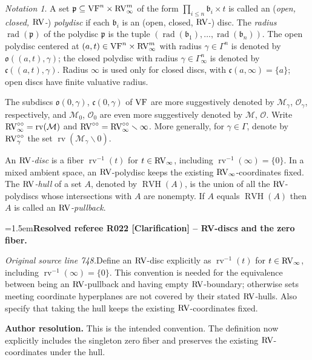 \documentclass[12pt]{amsart}
\newcommand{\ResolvedRefereeRemark}[5]{%
  \par\medskip\begingroup\normalfont\small\color{gray}%
  \emergencystretch=1.5em\noindent\textbf{Resolved referee R#1 [#2] -- #3.}\par\nobreak\noindent #4\par
  \medskip\color{ResolutionGreen}\noindent\textbf{Author resolution.} #5\par
  \endgroup\medskip
}
\newcommand{\memph}[1]{{\color{magenta}\emph{#1}}}
\theoremstyle{plain}
\theoremstyle{definition}
\theoremstyle{remark}
\newtheorem{nota}[thm]{Notation}
\numberwithin{equation}{section}
\theoremstyle{plain}
\newcommand{\VF}{\textup{VF}}
\newcommand{\RV}{\textup{RV}}
\newcommand{\MM}{\mdl M}
\newcommand{\OO}{\mdl O}
\newcommand{\gb}{\mathfrak{b}}
\newcommand{\gc}{\mathfrak{c}}
\newcommand{\go}{\mathfrak{o}}
\newcommand{\gp}{\mathfrak{p}}
\newcommand{\0}{\emptyset}
\newcommand{\mdl}[1]{\mathcal{#1}}  %
\newcommand{\sub}{\subseteq}
\newcommand{\mi}{\smallsetminus}
\DeclareMathOperator{\rv}{rv}
\DeclareMathOperator{\rad}{rad}
\DeclareMathOperator{\RVH}{RVH}
\newcommand{\ccirc}{\circ \circ}
\begin{document}
\begin{nota}\label{defn:disc}
A set $\gp \sub \VF^n \times \RV_\infty^m$ of the form $\prod_{i \leq n} \gb_i \times t$ is called an (\memph{open, closed, $\RV$-}) \memph{polydisc} if each $\gb_i$ is an (open, closed, $\RV$-) disc. The \memph{radius} $\rad(\gp)$ of the polydisc $\gp$ is the tuple $(\rad(\gb_1), \ldots, \rad(\gb_n))$. The open polydisc centered at $(a,t) \in \VF^n \times \RV_\infty^m$ with radius $\gamma \in \Gamma^n$ is denoted by $\go((a,t), \gamma)$; the closed polydisc with radius $\gamma \in \Gamma_\infty^n$ is denoted by $\gc((a,t), \gamma)$. Radius $\infty$ is used only for closed discs, with $\gc(a,\infty)=\{a\}$; open discs have finite valuative radius.

The subdiscs $\go(0, \gamma)$, $\gc(0, \gamma)$ of $\VF$ are more suggestively denoted by $\MM_\gamma$, $\OO_\gamma$, respectively, and $\MM_0$, $\OO_0$ are even more suggestively denoted by $\MM$, $\OO$. Write $\RV^{\ccirc}_\infty = \rv(\MM)$ and $\RV^{\ccirc} = \RV^{\ccirc}_\infty \mi \infty$. More generally, for $\gamma \in \Gamma$, denote by $\RV^{\ccirc}_\gamma$ the set $\rv(\MM_{\gamma} \mi 0)$.

An \memph{$\RV$-disc} is a fiber $\rv^{-1}(t)$ for $t\in\RV_\infty$, including $\rv^{-1}(\infty)=\{0\}$. In a mixed ambient space, an $\RV$-polydisc keeps the existing $\RV_\infty$-coordinates fixed. The \memph{$\RV$-hull} of a set $A$, denoted by $\RVH(A)$, is the union of all the $\RV$-polydiscs whose intersections with $A$ are nonempty. If $A$ equals $\RVH(A)$ then $A$ is called an \memph{$\RV$-pullback}.
\end{nota}

\ResolvedRefereeRemark{022}{Clarification}{RV-discs and the zero fiber}{%
\textit{Original source line 748.}\quad Define an $\RV$-disc explicitly as $\rv^{-1}(t)$ for $t\in\RV_\infty$, including $\rv^{-1}(\infty)=\{0\}$. This convention is needed for the equivalence between being an $\RV$-pullback and having empty $\RV$-boundary; otherwise sets meeting coordinate hyperplanes are not covered by their stated $\RV$-hulls. Also specify that taking the hull keeps the existing $\RV$-coordinates fixed.
}{This is the intended convention. The definition now explicitly includes the singleton zero fiber and preserves the existing $\RV$-coordinates under the hull.}
\end{document}
